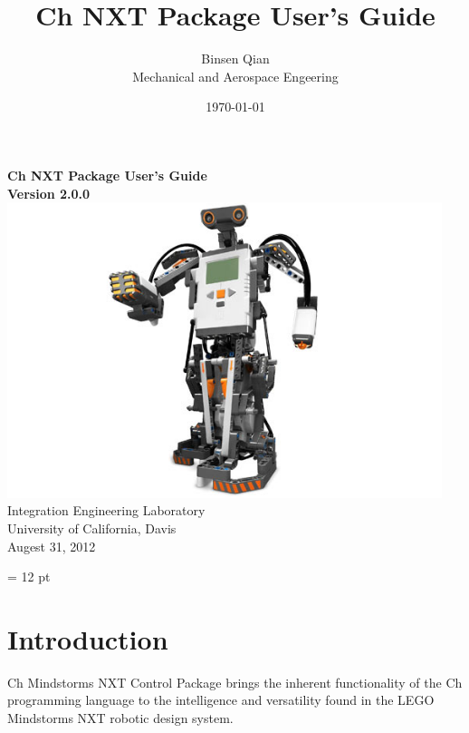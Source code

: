 \documentclass[11pt]{article}
\title{Ch NXT Package User's Guide}
\author{Binsen Qian\\Mechanical and Aerospace Engeering}
\date{\today}
\begin{document}
\begin{titlepage}
\begin{center}
\vspace*{2cm}
{\Huge\sf\bf Ch NXT Package User's Guide}\\
\vspace*{2cm}
{\bf Version 2.0.0}\\
\vspace*{2cm}
\includegraphics[width = 5in]{figure/mindstorm/NXT_humanoid.png}
\vspace*{2cm}
\newline
Integration Engineering Laboratory\\
University of California, Davis\\
Augest 31, 2012\\
\end{center}
\end{titlepage}

\newpage
\tableofcontents
\newpage
\baselineskip = 12 pt

\section{Introduction}
Ch Mindstorms NXT Control Package brings the inherent functionality of the Ch programming language
to the intelligence and versatility found in the LEGO Mindstorms NXT robotic design system.\\
\end{document}
